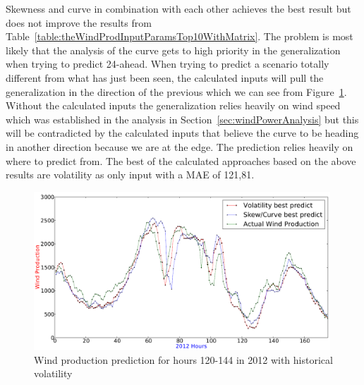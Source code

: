 Skewness and curve in combination with each other achieves the best result but does not improve the results from Table~\ref{table:theWindProdInputParamsTop10WithMatrix}. The problem is most likely that the analysis of the curve gets to high priority in the generalization when trying to predict 24-ahead. When trying to predict a scenario totally different from what has just been seen, the calculated inputs will pull the generalization in the direction of the previous which we can see from Figure~\ref{fig:bestStatisticalApproachGraph}. Without the calculated inputs the generalization relies heavily on wind speed which was established in the analysis in Section~\ref{sec:windPowerAnalysis} but this will be contradicted by the calculated inputs that believe the curve to be heading in another direction because we are at the edge. The prediction relies heavily on where to predict from. The best of the calculated approaches based on the above results are volatility as only input with a MAE of 121,81.

\begin{figure}[H]
\centering
\includegraphics[width=0.99\textwidth]{billeder/bestStatisticalApproachGraph.png}
\caption{Wind production prediction for hours 120-144 in 2012 with historical volatility}
\label{fig:bestStatisticalApproachGraph}
\end{figure} 

